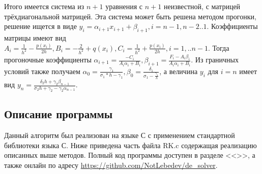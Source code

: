 \documentclass[a4paper,12pt,titlepage,finall]{article}
\begin{document}
Итого имеется система из $n+1$ уравнения с $n+1$ неизвестной, с матрицей трёхдиагональной матрицей. Эта система может быть решена методом прогонки, решение ищется в виде $y_i = \alpha_{i+1} x_{i+1} + \beta_{i+1}, i = n-1, n-2 .. 1$. Коэффициенты матрицы имеют вид $A_i = \frac{1}{h^2} - \frac{p(x_i)}{2h}, B_i = -\frac{2}{h^2} + q(x_i), C_i = \frac{1}{h^2} + \frac{p(x_i)}{2h}, i = 1, .. n -1$. Тогда прогоночные коэффициенты $\alpha_{i+1} = \frac{-C_i}{A_i \alpha_i + B_i}, \beta_{i+1} = \frac{F_i - A_i \beta_i}{A_i \alpha_i + B_i}$. Из граничных условий также получаем $\alpha_0 = \frac{\gamma_1}{\sigma_1 * h - \gamma_1}, \beta_0 = \frac{\delta_1}{\sigma_1 - \frac{\gamma_1}{h}}$, а величина $y_i$ для $i = n$ имеет вид $y_n = \frac{\delta_2 h + \gamma_2 \beta_{n-1}}{\sigma_2 h + \gamma_2 - \gamma_2 \alpha_{n-1}}$.

\newpage
\subsection{Описание программы}
Данный алгоритм был реализован на языке С с применением стандартной библиотеки языка С. Ниже приведена часть файла RK.c содержащая реализацию описанных выше методов. Полный код программы доступен в разделе <<>>, а также онлайн по адресу \url{https://github.com/NotLebedev/de_solver}.


\newpage
\end{document}
